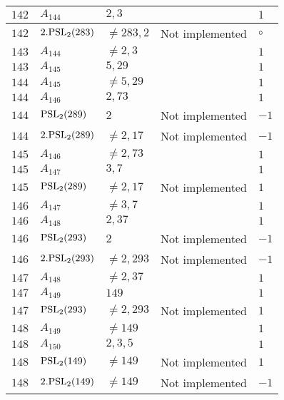 \documentclass[a4paper, 11pt]{article}
\begin{document}
\begin{longtable}{lllll}
        $ 142 $ & $ A_{144} $ & $ 2, 3 $ & $ ~ $ & $ 1  $ \\ \hline
        $ 142 $ & $ 2.{\rm PSL}_{2}(283) $ & $ \neq 283, 2 $ & Not implemented & $\circ$ \\ \hline
        $ 143 $ & $ A_{144} $ & $ \neq 2, 3 $ & $ ~ $ & $ 1  $ \\ \hline
        $ 143 $ & $ A_{145} $ & $ 5, 29 $ & $ ~ $ & $ 1  $ \\ \hline
        $ 144 $ & $ A_{145} $ & $ \neq 5, 29 $ & $ ~ $ & $ 1  $ \\ \hline
        $ 144 $ & $ A_{146} $ & $ 2, 73 $ & $ ~ $ & $ 1  $ \\ \hline
        $ 144 $ & $ {\rm PSL}_{2}(289) $ & $ 2 $ & Not implemented & $ -1  $ \\ \hline
        $ 144 $ & $ 2.{\rm PSL}_{2}(289) $ & $ \neq 2, 17 $ & Not implemented & $ -1  $ \\ \hline
        $ 145 $ & $ A_{146} $ & $ \neq 2, 73 $ & $ ~ $ & $ 1  $ \\ \hline
        $ 145 $ & $ A_{147} $ & $ 3, 7 $ & $ ~ $ & $ 1  $ \\ \hline
        $ 145 $ & $ {\rm PSL}_{2}(289) $ & $ \neq 2, 17 $ & Not implemented & $ 1  $ \\ \hline
        $ 146 $ & $ A_{147} $ & $ \neq 3, 7 $ & $ ~ $ & $ 1  $ \\ \hline
        $ 146 $ & $ A_{148} $ & $ 2, 37 $ & $ ~ $ & $ 1  $ \\ \hline
        $ 146 $ & $ {\rm PSL}_{2}(293) $ & $ 2 $ & Not implemented & $ -1  $ \\ \hline
        $ 146 $ & $ 2.{\rm PSL}_{2}(293) $ & $ \neq 2, 293 $ & Not implemented & $ -1  $ \\ \hline
        $ 147 $ & $ A_{148} $ & $ \neq 2, 37 $ & $ ~ $ & $ 1  $ \\ \hline
        $ 147 $ & $ A_{149} $ & $ 149 $ & $ ~ $ & $ 1  $ \\ \hline
        $ 147 $ & $ {\rm PSL}_{2}(293) $ & $ \neq 2, 293 $ & Not implemented & $ 1  $ \\ \hline
        $ 148 $ & $ A_{149} $ & $ \neq 149 $ & $ ~ $ & $ 1  $ \\ \hline
        $ 148 $ & $ A_{150} $ & $ 2, 3, 5 $ & $ ~ $ & $ 1  $ \\ \hline
        $ 148 $ & $ {\rm PSL}_{2}(149) $ & $ \neq 149 $ & Not implemented & $ 1  $ \\ \hline
        $ 148 $ & $ 2.{\rm PSL}_{2}(149) $ & $ \neq 149 $ & Not implemented & $ -1  $ \\ \hline

\end{longtable}
\end{document}
